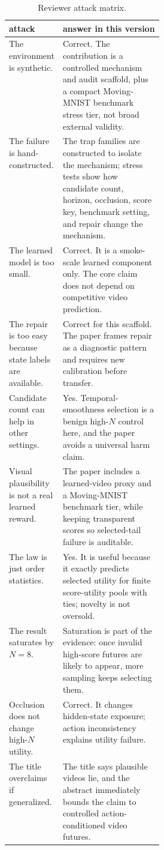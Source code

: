 \documentclass{article}
\begin{document}
\begin{table}[tbp]
  \centering
  \small
  \caption{Reviewer attack matrix.}
  \label{tab:attacks}
  \begin{tabularx}{\linewidth}{@{}p{0.30\linewidth}X@{}}
    \toprule
    attack & answer in this version \\
    \midrule
    The environment is synthetic. & Correct. The contribution is a controlled mechanism and audit scaffold, plus a compact Moving-MNIST benchmark stress tier, not broad external validity. \\
    The failure is hand-constructed. & The trap families are constructed to isolate the mechanism; stress tests show how candidate count, horizon, occlusion, score key, benchmark setting, and repair change the mechanism. \\
    The learned model is too small. & Correct. It is a smoke-scale learned component only. The core claim does not depend on competitive video prediction. \\
    The repair is too easy because state labels are available. & Correct for this scaffold. The paper frames repair as a diagnostic pattern and requires new calibration before transfer. \\
    Candidate count can help in other settings. & Yes. Temporal-smoothness selection is a benign high-\(N\) control here, and the paper avoids a universal harm claim. \\
    Visual plausibility is not a real learned reward. & The paper includes a learned-video proxy and a Moving-MNIST benchmark tier, while keeping transparent scores so selected-tail failure is auditable. \\
    The law is just order statistics. & Yes. It is useful because it exactly predicts selected utility for finite score-utility pools with ties; novelty is not oversold. \\
    The result saturates by \(N=8\). & Saturation is part of the evidence: once invalid high-score futures are likely to appear, more sampling keeps selecting them. \\
    Occlusion does not change high-\(N\) utility. & Correct. It changes hidden-state exposure; action inconsistency explains utility failure. \\
    The title overclaims if generalized. & The title says plausible videos lie, and the abstract immediately bounds the claim to controlled action-conditioned video futures. \\
    \bottomrule
  \end{tabularx}
\end{table}
\end{document}
